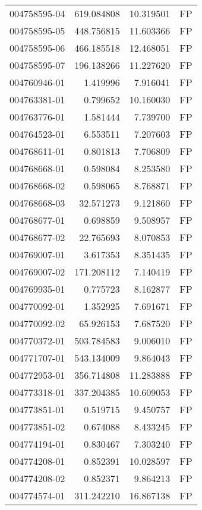 \begin{tabular}{lrrl}
004758595-04 &  619.084808 &    10.319501 &   FP \\
004758595-05 &  448.756815 &    11.603366 &   FP \\
004758595-06 &  466.185518 &    12.468051 &   FP \\
004758595-07 &  196.138266 &    11.227620 &   FP \\
004760946-01 &    1.419996 &     7.916041 &   FP \\
004763381-01 &    0.799652 &    10.160030 &   FP \\
004763776-01 &    1.581444 &     7.739700 &   FP \\
004764523-01 &    6.553511 &     7.207603 &   FP \\
004768611-01 &    0.801813 &     7.706809 &   FP \\
004768668-01 &    0.598084 &     8.253580 &   FP \\
004768668-02 &    0.598065 &     8.768871 &   FP \\
004768668-03 &   32.571273 &     9.121860 &   FP \\
004768677-01 &    0.698859 &     9.508957 &   FP \\
004768677-02 &   22.765693 &     8.070853 &   FP \\
004769007-01 &    3.617353 &     8.351435 &   FP \\
004769007-02 &  171.208112 &     7.140419 &   FP \\
004769935-01 &    0.775723 &     8.162877 &   FP \\
004770092-01 &    1.352925 &     7.691671 &   FP \\
004770092-02 &   65.926153 &     7.687520 &   FP \\
004770372-01 &  503.784583 &     9.006010 &   FP \\
004771707-01 &  543.134009 &     9.864043 &   FP \\
004772953-01 &  356.714808 &    11.283888 &   FP \\
004773318-01 &  337.204385 &    10.609053 &   FP \\
004773851-01 &    0.519715 &     9.450757 &   FP \\
004773851-02 &    0.674088 &     8.433245 &   FP \\
004774194-01 &    0.830467 &     7.303240 &   FP \\
004774208-01 &    0.852391 &    10.028597 &   FP \\
004774208-02 &    0.852371 &     9.864213 &   FP \\
004774574-01 &  311.242210 &    16.867138 &   FP \\

\end{tabular}

